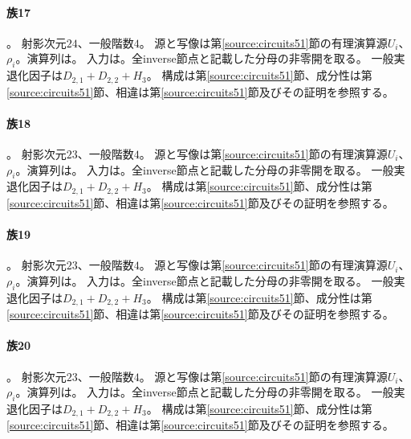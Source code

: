 \paragraph{族17}\label{catalogue:T17}
。
射影次元$24$、一般階数$4$。
源と写像は第\ref{source:circuits51}節の有理演算源$U_i$、$\rho_i$。演算列は。
入力は。全inverse節点と記載した分母の非零開を取る。
一般実退化因子は$D_{2,1}+D_{2,2}+H_{3}$。
構成は第\ref{source:circuits51}節、成分性は第\ref{source:circuits51}節、相違は第\ref{source:circuits51}節及びその証明を参照する。

\paragraph{族18}\label{catalogue:T18}
。
射影次元$23$、一般階数$4$。
源と写像は第\ref{source:circuits51}節の有理演算源$U_i$、$\rho_i$。演算列は。
入力は。全inverse節点と記載した分母の非零開を取る。
一般実退化因子は$D_{2,1}+D_{2,2}+H_{3}$。
構成は第\ref{source:circuits51}節、成分性は第\ref{source:circuits51}節、相違は第\ref{source:circuits51}節及びその証明を参照する。

\paragraph{族19}\label{catalogue:T19}
。
射影次元$23$、一般階数$4$。
源と写像は第\ref{source:circuits51}節の有理演算源$U_i$、$\rho_i$。演算列は。
入力は。全inverse節点と記載した分母の非零開を取る。
一般実退化因子は$D_{2,1}+D_{2,2}+H_{3}$。
構成は第\ref{source:circuits51}節、成分性は第\ref{source:circuits51}節、相違は第\ref{source:circuits51}節及びその証明を参照する。

\paragraph{族20}\label{catalogue:T20}
。
射影次元$23$、一般階数$4$。
源と写像は第\ref{source:circuits51}節の有理演算源$U_i$、$\rho_i$。演算列は。
入力は。全inverse節点と記載した分母の非零開を取る。
一般実退化因子は$D_{2,1}+D_{2,2}+H_{3}$。
構成は第\ref{source:circuits51}節、成分性は第\ref{source:circuits51}節、相違は第\ref{source:circuits51}節及びその証明を参照する。

